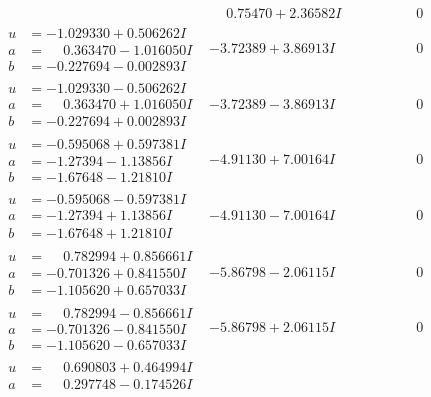 \documentclass[1p]{elsarticle_modified}
\theoremstyle{definition}
\begin{document}
$$\begin{array}{c|c|c}
 & \phantom{-}0.75470 + 2.36582 I & \phantom{-0.000000 } 0 \\ \hline\begin{aligned}
u &= -1.029330 + 0.506262 I \\
a &= \phantom{-}0.363470 - 1.016050 I \\
b &= -0.227694 - 0.002893 I\end{aligned}
 & -3.72389 + 3.86913 I & \phantom{-0.000000 } 0 \\ \hline\begin{aligned}
u &= -1.029330 - 0.506262 I \\
a &= \phantom{-}0.363470 + 1.016050 I \\
b &= -0.227694 + 0.002893 I\end{aligned}
 & -3.72389 - 3.86913 I & \phantom{-0.000000 } 0 \\ \hline\begin{aligned}
u &= -0.595068 + 0.597381 I \\
a &= -1.27394 - 1.13856 I \\
b &= -1.67648 - 1.21810 I\end{aligned}
 & -4.91130 + 7.00164 I & \phantom{-0.000000 } 0 \\ \hline\begin{aligned}
u &= -0.595068 - 0.597381 I \\
a &= -1.27394 + 1.13856 I \\
b &= -1.67648 + 1.21810 I\end{aligned}
 & -4.91130 - 7.00164 I & \phantom{-0.000000 } 0 \\ \hline\begin{aligned}
u &= \phantom{-}0.782994 + 0.856661 I \\
a &= -0.701326 + 0.841550 I \\
b &= -1.105620 + 0.657033 I\end{aligned}
 & -5.86798 - 2.06115 I & \phantom{-0.000000 } 0 \\ \hline\begin{aligned}
u &= \phantom{-}0.782994 - 0.856661 I \\
a &= -0.701326 - 0.841550 I \\
b &= -1.105620 - 0.657033 I\end{aligned}
 & -5.86798 + 2.06115 I & \phantom{-0.000000 } 0 \\ \hline\begin{aligned}
u &= \phantom{-}0.690803 + 0.464994 I \\
a &= \phantom{-}0.297748 - 0.174526 I \\

\end{aligned}
\end{array}$$
\end{document}
